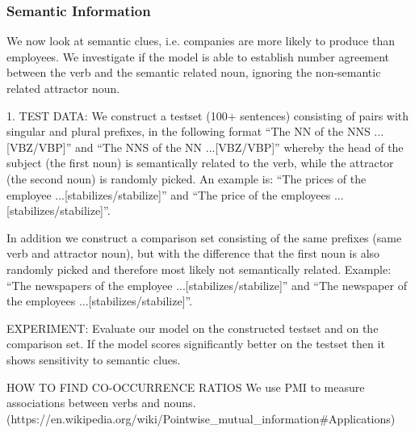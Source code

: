 \begin{multicols}{2}


\subsubsection{Semantic Information}

We now look at semantic clues, i.e. companies
are more likely to produce than employees.
We investigate if the model is able to establish
number agreement between the verb and the semantic related noun,
ignoring the non-semantic related attractor noun.
  
1. TEST DATA:
We construct a testset (100+ sentences) consisting of pairs with singular and plural prefixes, in the following format  
``The NN of the NNS ...[VBZ/VBP]'' and
``The NNS of the NN ...[VBZ/VBP]'' 
whereby the head of the subject (the first noun)
is semantically related to the verb, while the attractor (the second noun)
is randomly picked. An example is:
``The prices of the employee ...[stabilizes/stabilize]'' and 
``The price of the employees ...[stabilizes/stabilize]''.

In addition we construct a comparison set consisting of the same prefixes
(same verb and attractor noun),
but with the difference that the first noun is also randomly picked and
therefore most likely not semantically related. Example:
``The newspapers of the employee ...[stabilizes/stabilize]'' and 
``The newspaper of the employees ...[stabilizes/stabilize]''.


EXPERIMENT:
Evaluate our model on the constructed testset and on the comparison set.
If the model scores significantly better on the testset
then it shows sensitivity to semantic clues.


HOW TO FIND CO-OCCURRENCE RATIOS
We use PMI to measure associations between verbs and nouns.
(https://en.wikipedia.org/wiki/Pointwise_mutual_information#Applications)


\end{multicols}
